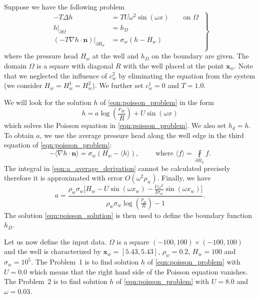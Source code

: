 \documentclass{elsarticle}
\newcommand{\prob}[1]{Problem~{#1}}
\def\vc#1{\mathbf{\boldsymbol{#1}}}     %
\begin{document}
Suppose we have the following problem
\begin{equation} \label{eqn:poisson_problem}
\left.\begin{aligned}
    -T \Delta h &= TU\omega^2\sin(\omega x) \qquad \textrm{on } \Omega \\
    h|_{\partial\Omega} &= h_D\\
    \left(-T\nabla h\cdot\vc{n}\right)|_{\partial B_w} &= \sigma_w\left(h - H_w\right) \\
    \end{aligned}
    \;\right\}
\end{equation}
where the pressure head $H_w$ at the well and $h_D$ on the boundary are given. 
The domain $\Omega$ is a square with diagonal $R$ with the well placed at the point $\vc{x}_w$.
Note that we neglected the influence of $c^2_w$ by eliminating the equation from the system (we consider 
$H_w = H^1_w = H^2_w$). We further set $c^1_w=0$ and $T=1.0$. 

We will look for the solution $h$ of \eqref{eqn:poisson_problem} in the form
\begin{equation} \label{eqn:poisson_solution}
  h=a\log\left(\frac{r_w}{R}\right)+U\sin(\omega x)
\end{equation}
which solves the Poisson equation in \eqref{eqn:poisson_problem}. We also set $h_d=h$.
To obtain $a$, we use the average pressure head along the well edge in the third equation 
of \eqref{eqn:poisson_problem}:
\begin{equation} \label{eqn:a_average_derivation}
     -\langle\nabla h \cdot \vc{n}\rangle = \sigma_w\left(H_w - \langle{h}\rangle \right), 
    \qquad \textrm{ where } \langle{f}\rangle = \fint \limits_{\partial B_w} f.
\end{equation}
The integral in \eqref{eqn:a_average_derivation} cannot be calculated precisely therefore it is approximated with error 
$O(\omega^2 \rho_w)$. Finally, we have
\begin{equation} \label{eqn:a_constant}
    a=\frac{\rho_w \sigma_w \big[H_w - U\sin(\omega x_w) - \frac{U\omega^2}{2\sigma_w}\sin(\omega x_w)\big]}
           {\rho_w \sigma_w \log\left(\frac{\rho_w}{R}\right) - 1}.
\end{equation}
The solution \eqref{eqn:poisson_solution} is then used to define the boundary function $h_D$.

Let us now define the input data. $\Omega$ is a square $(-100,100)\times(-100,100)$ and the well is characterized by 
$\vc{x}_w=[5.43,5.43]$,  $\rho_w=0.2$, $H_w=100$ and $\sigma_w=10^5$. The \prob{1} is to find solution $h$ of
\eqref{eqn:poisson_problem} with $U=0.0$ which means that the right hand side of the Poisson equation vanishes.
The \prob{2} is to find solution $h$ of \eqref{eqn:poisson_problem} with $U=8.0$ and $\omega=0.03$.
\end{document}
